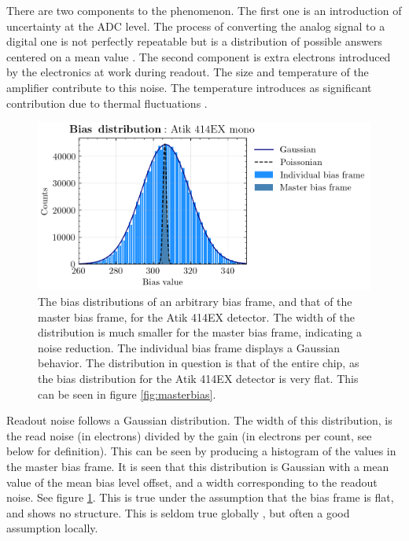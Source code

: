 \documentclass[../main.tex]{subfiles}
\begin{document}
	There are two components to the phenomenon. The first one is an introduction of uncertainty at the ADC level. The process of converting the analog signal to a digital one is not perfectly repeatable but is a distribution of possible answers centered on a mean value \cite{handbookofccdastronomy}. The second component is extra electrons introduced by the electronics at work during readout.
	The size and temperature of the amplifier contribute to this noise. The temperature introduces as significant contribution due to thermal fluctuations \cite{handbookofccdastronomy}. 
		
	\begin{figure}[h!]
		\centering
		\includegraphics[width	=\textwidth]{gauss_bias.png}
		\caption{The bias distributions of an arbitrary bias frame, and that of the master bias frame, for the Atik 414EX detector. The width of the distribution is much smaller for the master bias frame, indicating a noise reduction. The individual bias frame displays a Gaussian behavior. The distribution in question is that of the entire chip, as the bias distribution for the Atik 414EX detector is very flat. This can be seen in figure \ref{fig:masterbias}.}
		\label{fig:rongauss}
	\end{figure} 
	
	Readout noise follows a Gaussian distribution. The width of this distribution, is the read noise (in electrons) divided by the gain (in electrons per count, see below for definition). This can be seen by producing a histogram of the values in the master bias frame. It is seen that this distribution is Gaussian with a mean value of the mean bias level offset, and a width corresponding to the readout noise. See figure \ref{fig:rongauss}. This is true under the assumption that the bias frame is flat, and shows no structure. This is seldom true globally \cite{handbookofccdastronomy}, but often a good assumption locally. 
	
\end{document}
